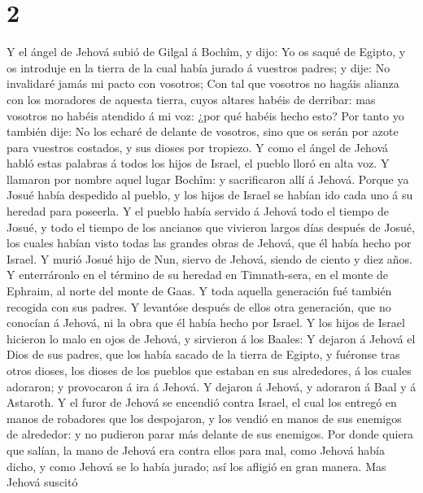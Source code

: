 \hypertarget{section-1}{%
\section{2}\label{section-1}}

 Y el ángel de Jehová subió de Gilgal á Bochîm, y dijo: Yo
os saqué de Egipto, y os introduje en la tierra de la cual había jurado
á vuestros padres; y dije: No invalidaré jamás mi pacto con vosotros;
 Con tal que vosotros no hagáis alianza con los moradores de
aquesta tierra, cuyos altares habéis de derribar: mas vosotros no habéis
atendido á mi voz: ¿por qué habéis hecho esto?  Por tanto yo
también dije: No los echaré de delante de vosotros, sino que os serán
por azote para vuestros costados, y sus dioses por tropiezo.
 Y como el ángel de Jehová habló estas palabras á todos los
hijos de Israel, el pueblo lloró en alta voz.  Y llamaron
por nombre aquel lugar Bochîm: y sacrificaron allí á Jehová.
 Porque ya Josué había despedido al pueblo, y los hijos de
Israel se habían ido cada uno á su heredad para poseerla.  Y
el pueblo había servido á Jehová todo el tiempo de Josué, y todo el
tiempo de los ancianos que vivieron largos días después de Josué, los
cuales habían visto todas las grandes obras de Jehová, que él había
hecho por Israel.  Y murió Josué hijo de Nun, siervo de
Jehová, siendo de ciento y diez años.  Y enterráronlo en el
término de su heredad en Timnath-sera, en el monte de Ephraim, al norte
del monte de Gaas.  Y toda aquella generación fué también
recogida con sus padres. Y levantóse después de ellos otra generación,
que no conocían á Jehová, ni la obra que él había hecho por Israel.
 Y los hijos de Israel hicieron lo malo en ojos de Jehová,
y sirvieron á los Baales:  Y dejaron á Jehová el Dios de
sus padres, que los había sacado de la tierra de Egipto, y fuéronse tras
otros dioses, los dioses de los pueblos que estaban en sus alrededores,
á los cuales adoraron; y provocaron á ira á Jehová.  Y
dejaron á Jehová, y adoraron á Baal y á Astaroth.  Y el
furor de Jehová se encendió contra Israel, el cual los entregó en manos
de robadores que los despojaron, y los vendió en manos de sus enemigos
de alrededor: y no pudieron parar más delante de sus enemigos.
 Por donde quiera que salían, la mano de Jehová era contra
ellos para mal, como Jehová había dicho, y como Jehová se lo había
jurado; así los afligió en gran manera.  Mas Jehová suscitó
